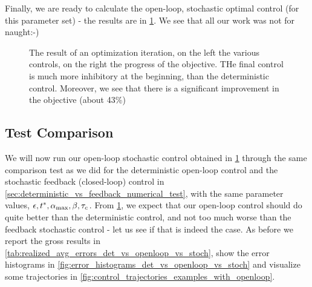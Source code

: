 \documentclass{article}
\begin{document}
Finally, we are ready to calculate the open-loop, stochastic optimal control
(for this parameter set) - the results are in
\cref{fig:FP_adjoint_objective_control_convergence}. We see that all our work
was not for naught:-)

\begin{figure}[h]
\begin{center}
\caption[ ]{The result of an optimization iteration, on the left the various
controls, on the right the progress of the objective. THe final control is much
more inhibitory at the beginning, than the deterministic control. Moreover, we
see that there is a significant improvement in the objective (about 43\%)}
\label{fig:FP_adjoint_objective_control_convergence}
\end{center}
\end{figure}


\subsection{Test Comparison}
\label{sec:probabilistic_numerical_test}
We will now run our open-loop stochastic control obtained in \cref{fig:FP_adjoint_objective_control_convergence}
through the same comparison test as we did for the deterministic open-loop control and the stochastic
feedback (closed-loop) control in
\cref{sec:deterministic_vs_feedback_numerical_test}, with the same parameter
values, ${\epsilon}, { t^* }, { {\alpha}_{\textrm{max}} }, \beta, { \tau_{c} }$. From
\cref{fig:FP_adjoint_objective_control_convergence}, we expect that our
open-loop control should do quite better than the deterministic control, and not
too much worse than the feedback stochastic control - let us see if that is
indeed the case. As before we report the gross results in
\cref{tab:realized_avg_errors_det_vs_openloop_vs_stoch}, show the error
histograms in \cref{fig:error_histograms_det_vs_openloop_vs_stoch} and
visualize some trajectories in
\cref{fig:control_trajectories_examples_with_openloop}. 
\end{document}
